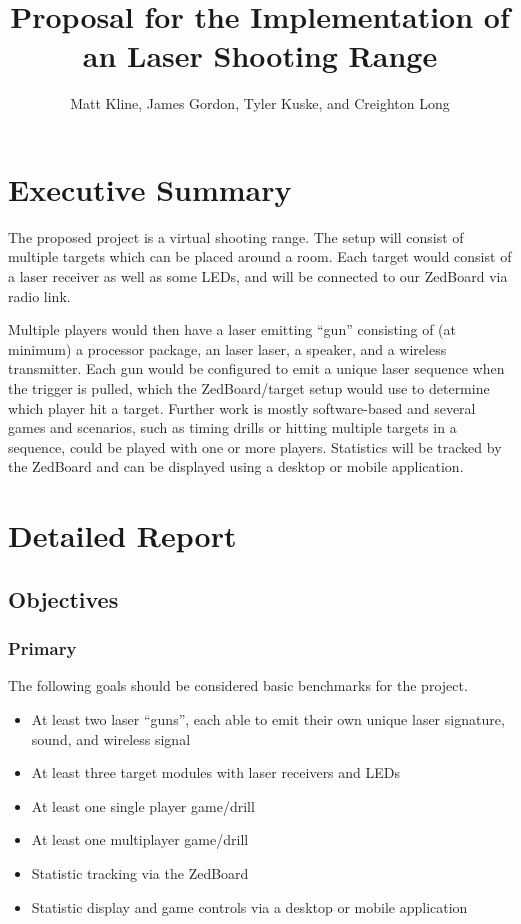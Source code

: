 \documentclass{article}
\title{Proposal for the Implementation of an Laser Shooting Range}
\author{Matt Kline, James Gordon, Tyler Kuske, and Creighton Long}
\begin{document}
\maketitle
\newpage
\tableofcontents
\newpage

\section{Executive Summary}

The proposed project is a virtual shooting range.
The setup will consist of multiple targets which can be placed around a room.
Each target would consist of a laser receiver as well as some LEDs, and will be connected to our ZedBoard via radio link.

Multiple players would then have a laser emitting ``gun''
consisting of (at minimum) a processor package, an laser laser, a speaker, and a wireless transmitter.
Each gun would be configured to emit a unique laser sequence when the trigger is pulled,
which the ZedBoard/target setup would use to determine which player hit a target.
Further work is mostly software-based and several games and scenarios,
such as timing drills or hitting multiple targets in a sequence, could be played with one or more players.
Statistics will be tracked by the ZedBoard and can be displayed using a desktop or mobile application.

\newpage

\section{Detailed Report}

\subsection{Objectives}

\subsubsection{Primary}

The following goals should be considered basic benchmarks for the project.

\begin{itemize}
\item At least two laser ``guns'', each able to emit their own unique laser signature, sound, and wireless signal
\item At least three target modules with laser receivers and LEDs
\item At least one single player game/drill
\item At least one multiplayer game/drill
\item Statistic tracking via the ZedBoard
\item Statistic display and game controls via a desktop or mobile application
\end{itemize}
\end{document}
